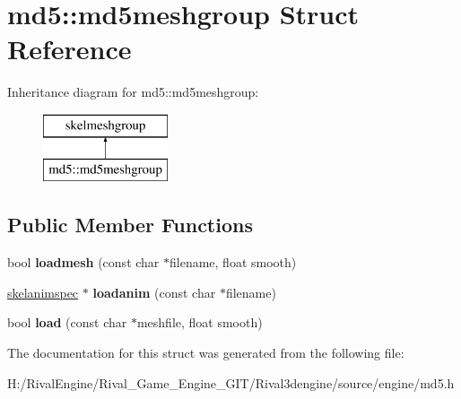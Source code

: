 \hypertarget{structmd5_1_1md5meshgroup}{}\section{md5\+:\+:md5meshgroup Struct Reference}
\label{structmd5_1_1md5meshgroup}
Inheritance diagram for md5\+:\+:md5meshgroup\+:\begin{figure}[H]
\begin{center}
\leavevmode
\includegraphics[height=2.000000cm]{structmd5_1_1md5meshgroup}
\end{center}
\end{figure}
\subsection*{Public Member Functions}
\begin{DoxyCompactItemize}
\item 
\mbox{\label{structmd5_1_1md5meshgroup_a9a7cf8c1dca9602ccae6c7cef50132e6}} 
bool {\bfseries loadmesh} (const char $\ast$filename, float smooth)
\item 
\mbox{\label{structmd5_1_1md5meshgroup_a6bbf9fa8b95a228c650d1a862aa83add}} 
\hyperlink{structskelmodel_1_1skelanimspec}{skelanimspec} $\ast$ {\bfseries loadanim} (const char $\ast$filename)
\item 
\mbox{\label{structmd5_1_1md5meshgroup_a65b0f67fa289cd43bf2f5a911fcc66fd}} 
bool {\bfseries load} (const char $\ast$meshfile, float smooth)
\end{DoxyCompactItemize}


The documentation for this struct was generated from the following file\+:\begin{DoxyCompactItemize}
\item 
H\+:/\+Rival\+Engine/\+Rival\+\_\+\+Game\+\_\+\+Engine\+\_\+\+G\+I\+T/\+Rival3dengine/source/engine/md5.\+h\end{DoxyCompactItemize}
